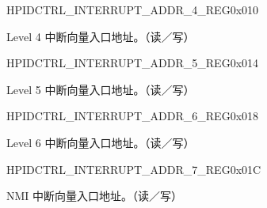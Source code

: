     
    \begin{register}{H}{PIDCTRL\_INTERRUPT\_ADDR\_4\_REG}{0x010}\label{regdesc:PIDCTRLINTERRUPTADDR4REG}
    \regnewline%
    \begin{regdesc}\begin{reglist}
    \item [PIDCTRL\_INTERRUPT\_ADDR\_4\_REG]Level 4 中断向量入口地址。（读／写）
    \end{reglist}\end{regdesc}
    \end{register}
    
    
    \begin{register}{H}{PIDCTRL\_INTERRUPT\_ADDR\_5\_REG}{0x014}\label{regdesc:PIDCTRLINTERRUPTADDR5REG}
    \regnewline%
    \begin{regdesc}\begin{reglist}
    \item [PIDCTRL\_INTERRUPT\_ADDR\_5\_REG]Level 5 中断向量入口地址。（读／写）
    \end{reglist}\end{regdesc}
    \end{register}
    
    
    \begin{register}{H}{PIDCTRL\_INTERRUPT\_ADDR\_6\_REG}{0x018}\label{regdesc:PIDCTRLINTERRUPTADDR6REG}
    \regnewline%
    \begin{regdesc}\begin{reglist}
    \item [PIDCTRL\_INTERRUPT\_ADDR\_6\_REG]Level 6 中断向量入口地址。（读／写）
    \end{reglist}\end{regdesc}
    \end{register}
    
    
    \begin{register}{H}{PIDCTRL\_INTERRUPT\_ADDR\_7\_REG}{0x01C}\label{regdesc:PIDCTRLINTERRUPTADDR7REG}
    \regnewline%
    \begin{regdesc}\begin{reglist}
    \item [PIDCTRL\_INTERRUPT\_ADDR\_7\_REG]NMI 中断向量入口地址。（读／写）
    \end{reglist}\end{regdesc}
    \end{register}
    
